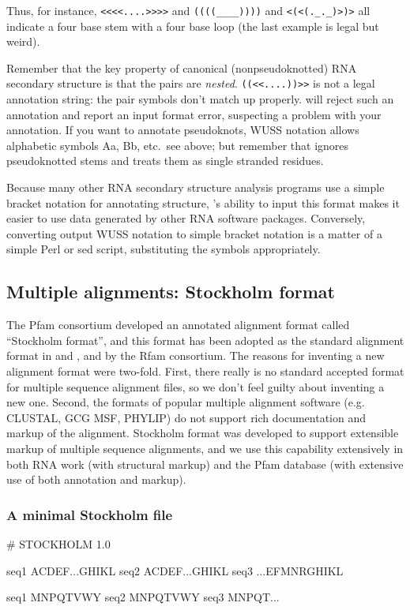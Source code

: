 Thus, for instance, \verb+<<<<....>>>>+ and \verb+((((____))))+ and
\verb+<(<(._._)>)>+ all indicate a four base stem with a four base
loop (the last example is legal but weird). 

Remember that the key property of canonical (nonpseudoknotted) RNA
secondary structure is that the pairs are \emph{nested}.
\verb+((<<....))>>+ is not a legal annotation string: the pair symbols
don't match up properly.  will reject such an
annotation and report an input format error, suspecting a problem with
your annotation.  If you want to annotate pseudoknots, WUSS notation
allows alphabetic symbols Aa, Bb, etc.\, see above; but remember that
 ignores pseudoknotted stems and treats them as
single stranded residues.

Because many other RNA secondary structure analysis programs use a
simple bracket notation for annotating structure,
's ability to input this format makes it easier to
use data generated by other RNA software packages. Conversely,
converting  output WUSS notation to simple bracket
notation is a matter of a simple Perl or sed script, substituting the
symbols appropriately.

\subsection{Multiple alignments: Stockholm format}
\label{pg:stockholm}

The Pfam consortium developed an annotated alignment format called
``Stockholm format'', and this format has been adopted as the standard
alignment format in  and , and by
the Rfam consortium. The reasons for inventing a new alignment format
were two-fold. First, there really is no standard accepted format for
multiple sequence alignment files, so we don't feel guilty about
inventing a new one. Second, the formats of popular multiple alignment
software (e.g. CLUSTAL, GCG MSF, PHYLIP) do not support rich
documentation and markup of the alignment.  Stockholm format was
developed to support extensible markup of multiple sequence
alignments, and we use this capability extensively in both RNA work
(with structural markup) and the Pfam database (with extensive use of
both annotation and markup).

\subsubsection{A minimal Stockholm file}
\begin{sreoutput}
# STOCKHOLM 1.0

seq1  ACDEF...GHIKL
seq2  ACDEF...GHIKL
seq3  ...EFMNRGHIKL

seq1  MNPQTVWY
seq2  MNPQTVWY
seq3  MNPQT...
\end{sreoutput}

